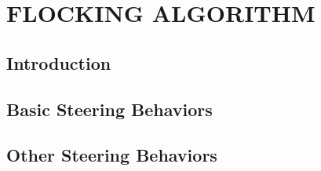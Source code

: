 \chapter{FLOCKING ALGORITHM}

\section{Introduction}

\section{Basic Steering Behaviors}

\section{Other Steering Behaviors}



